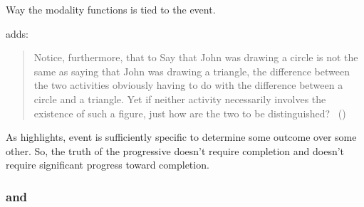 \begin{note}
  Way the modality functions is tied to the event.

  \citeauthor{Dowty:1979vq} adds:
  \begin{quote}
    Notice, furthermore, that to Say that John was drawing a circle is not the same as saying that John was drawing a triangle, the difference between the two activities obviously having to do with the difference between a circle and a triangle.
    Yet if neither activity necessarily involves the existence of such a figure, just how are the two to be distinguished?%
    \mbox{ }\hfill\mbox{(\citeyear[133]{Dowty:1979vq})}
  \end{quote}

  As \citeauthor{Dowty:1979vq} highlights, event is sufficiently specific to determine some outcome over some other.
  So, the truth of the progressive doesn't require completion and doesn't require significant progress toward completion.
\end{note}

\subsubsection{ and }
\label{sec:assupp2}

